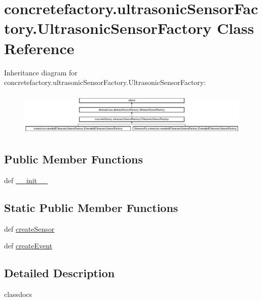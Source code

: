 \hypertarget{classconcretefactory_1_1ultrasonicSensorFactory_1_1UltrasonicSensorFactory}{}\section{concretefactory.\+ultrasonic\+Sensor\+Factory.\+Ultrasonic\+Sensor\+Factory Class Reference}
\label{classconcretefactory_1_1ultrasonicSensorFactory_1_1UltrasonicSensorFactory}
Inheritance diagram for concretefactory.\+ultrasonic\+Sensor\+Factory.\+Ultrasonic\+Sensor\+Factory\+:\begin{figure}[H]
\begin{center}
\leavevmode
\includegraphics[height=2.097378cm]{classconcretefactory_1_1ultrasonicSensorFactory_1_1UltrasonicSensorFactory}
\end{center}
\end{figure}
\subsection*{Public Member Functions}
\begin{DoxyCompactItemize}
\item 
def \hyperlink{classconcretefactory_1_1ultrasonicSensorFactory_1_1UltrasonicSensorFactory_a446527986bf12c01025c902cac59f8f0}{\+\_\+\+\_\+init\+\_\+\+\_\+}
\end{DoxyCompactItemize}
\subsection*{Static Public Member Functions}
\begin{DoxyCompactItemize}
\item 
def \hyperlink{classconcretefactory_1_1ultrasonicSensorFactory_1_1UltrasonicSensorFactory_ade21ba1ce348eb9e5cf8eee3fda4a773}{create\+Sensor}
\item 
def \hyperlink{classconcretefactory_1_1ultrasonicSensorFactory_1_1UltrasonicSensorFactory_ae4b2ae56472e8dcc11bb3d6569a69177}{create\+Event}
\end{DoxyCompactItemize}


\subsection{Detailed Description}
\begin{DoxyVerb}classdocs
\end{DoxyVerb}
 

